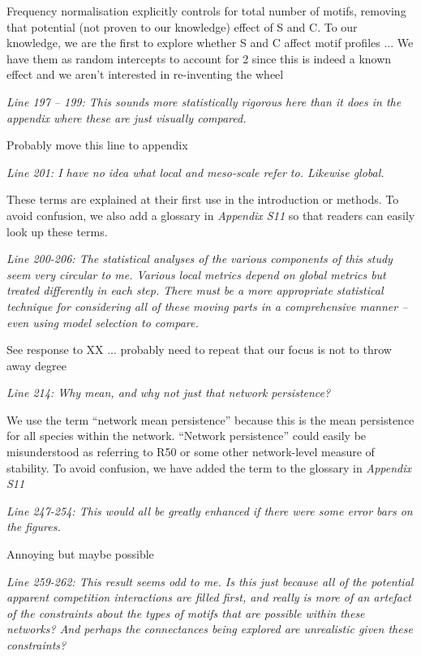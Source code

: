 \documentclass[12pt]{article}
\newcommand{\us}{\rm \setlength{\leftskip}{0.3cm} \setlength{\rightskip}{0.3cm}}
\newcommand{\them}{\it \setlength{\leftskip}{0cm} \setlength{\rightskip}{0cm}}
\begin{document}
\us Frequency normalisation explicitly controls for total number of motifs, removing that potential (not proven to our knowledge) effect of S and C. To our knowledge, we are the first to explore whether S and C affect motif profiles ... 
We have them as random intercepts to account for 2 since this is indeed a known effect and we aren't interested in re-inventing the wheel

\them
Line 197 – 199: This sounds more statistically rigorous here than it does in the appendix where these are just visually compared.

\us Probably move this line to appendix

\them
Line 201: I have no idea what local and meso-scale refer to. Likewise global.

\us These terms are explained at their first use in the introduction or methods. To avoid confusion, we also add a glossary in \emph{Appendix S11} so that readers can easily look up these terms.

\them
Line 200-206: The statistical analyses of the various components of this study seem very circular to me. Various local metrics depend on global metrics but treated differently in each step. There must be a more appropriate statistical technique for considering all of these moving parts in a comprehensive manner – even using model selection to compare.

\us See response to XX ... probably need to repeat that our focus is not to throw away degree

\them
Line 214: Why mean, and why not just that network persistence?

\us We use the term ``network mean persistence'' because this is the mean persistence for all species within the network. ``Network persistence'' could easily be misunderstood as referring to R50 or some other network-level measure of stability. To avoid confusion, we have added the term to the glossary in \emph{Appendix S11}


\them
Line 247-254: This would all be greatly enhanced if there were some error bars on the figures.

\us Annoying but maybe possible

\them
Line 259-262: This result seems odd to me. Is this just because all of the potential apparent competition interactions are filled first, and really is more of an artefact of the constraints about the types of motifs that are possible within these networks? And perhaps the connectances being explored are unrealistic given these constraints?
\end{document}
